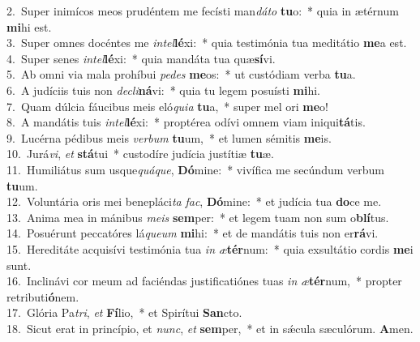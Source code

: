 {2.~}Super inimícos meos prudéntem me fecísti man\textit{dá}\textit{to} \textbf{tu}o:~* quia in ætérnum \textbf{mi}hi est.\\
{3.~}Super omnes docéntes me \textit{in}\textit{tel}\textbf{lé}xi:~* quia testimónia tua meditátio \textbf{me}a est.\\
{4.~}Super senes \textit{in}\textit{tel}\textbf{lé}xi:~* quia mandáta tua quæ\textbf{sí}vi.\\
{5.~}Ab omni via mala prohíbui \textit{pe}\textit{des} \textbf{me}os:~* ut custódiam verba \textbf{tu}a.\\
{6.~}A judíciis tuis non \textit{de}\textit{cli}\textbf{ná}vi:~* quia tu legem posuísti \textbf{mi}hi.\\
{7.~}Quam dúlcia fáucibus meis eló\textit{qui}\textit{a} \textbf{tu}a,~* super mel ori \textbf{me}o!\\
{8.~}A mandátis tuis \textit{in}\textit{tel}\textbf{lé}xi:~* proptérea odívi omnem viam iniqui\textbf{tá}tis.\\
{9.~}Lucérna pédibus meis \textit{ver}\textit{bum} \textbf{tu}um,~* et lumen sémitis \textbf{me}is.\\
{10.~}Jurá\textit{vi}, \textit{et} \textbf{stá}tui~* custodíre judícia justítiæ \textbf{tu}æ.\\
{11.~}Humiliátus sum usque\textit{quá}\textit{que}, \textbf{Dó}mine:~* vivífica me secúndum verbum \textbf{tu}um.\\
{12.~}Voluntária oris mei benepláci\textit{ta} \textit{fac}, \textbf{Dó}mine:~* et judícia tua \textbf{do}ce me.\\
{13.~}Anima mea in mánibus \textit{me}\textit{is} \textbf{sem}per:~* et legem tuam non sum o\textbf{blí}tus.\\
{14.~}Posuérunt peccatóres lá\textit{que}\textit{um} \textbf{mi}hi:~* et de mandátis tuis non er\textbf{rá}vi.\\
{15.~}Hereditáte acquisívi testimónia tua \textit{in} \textit{æ}\textbf{tér}num:~* quia exsultátio cordis \textbf{me}i sunt.\\
{16.~}Inclinávi cor meum ad faciéndas justificatiónes tuas \textit{in} \textit{æ}\textbf{tér}num,~* propter retributi\textbf{ó}nem.\\
{17.~}Glória Pa\textit{tri}, \textit{et} \textbf{Fí}lio,~* et Spirítui \textbf{San}cto.\\
{18.~}Sicut erat in princípio, et \textit{nunc}, \textit{et} \textbf{sem}per,~* et in sǽcula sæculórum. \textbf{A}men.\\
